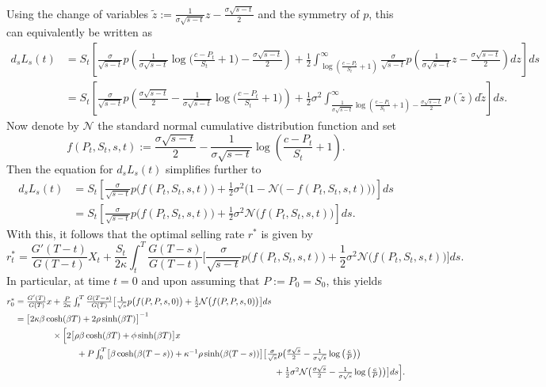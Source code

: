 \documentclass[openany,oneside]{article}
\theoremstyle{definition}
\theoremstyle{remark}
\newcommand{\ts}{\textstyle}
\begin{document}
{\color{blue}Using the change of variables $\tilde z := \frac{1}{\sigma\sqrt{s-t}}z-\frac{\sigma\sqrt{s-t}}{2}$ and the symmetry of $p$, this can equivalently be written as
\begin{align*}
 \ts d_s L_s(t) &\ts= S_t\left[ \frac{\sigma}{\sqrt{s-t}}p\left(\frac{1}{\sigma\sqrt{s-t}}\log\bigl(\frac{c-P_t}{S_t}+1\bigr)-\frac{\sigma\sqrt{s-t}}{2} \right)+\frac{1}{2}\int_{\log\left(\frac{c-P_t}{S_t}+1\right)}^\infty \frac{\sigma}{\sqrt{s-t}}p\left(\frac{1}{\sigma\sqrt{s-t}}z-\frac{\sigma\sqrt{s-t}}{2}\right)dz \right] ds\\
  &\ts = S_t\left[ \frac{\sigma}{\sqrt{s-t}}p\left(\frac{\sigma\sqrt{s-t}}{2}-\frac{1}{\sigma\sqrt{s-t}}\log\bigl(\frac{c-P_t}{S_t}+1\bigr) \right)+\frac{1}{2}\sigma^2 \int_{\frac{1}{\sigma\sqrt{s-t}}\log\left(\frac{c-P_t}{S_t}+1\right) - \frac{\sigma\sqrt{s-t}}{2}}^\infty p(\tilde z)d\tilde z \right] ds.
\end{align*}
Now denote by $\mathcal N$ the standard normal cumulative distribution function and set
\[
 \ts f(P_t,S_t,s,t) := \frac{\sigma\sqrt{s-t}}{2} - \frac{1}{\sigma\sqrt{s-t}}\log\left(\frac{c-P_t}{S_t}+1\right).
\]
Then the equation for $d_s L_s(t)$ simplifies further to
\begin{align*}
 \ts d_s L_s(t) &\ts= S_t\left[ \frac{\sigma}{\sqrt{s-t}}p\bigl(f(P_t,S_t,s,t)\bigr)+\frac{1}{2}\sigma^2 \bigl(1 - \mathcal N\bigl(-f(P_t,S_t,s,t)\bigr)\bigr)\right] ds\\
  &\ts= S_t\left[ \frac{\sigma}{\sqrt{s-t}}p\bigl(f(P_t,S_t,s,t)\bigr)+\frac{1}{2}\sigma^2 \mathcal N\bigl(f(P_t,S_t,s,t)\bigr)\right] ds.
\end{align*}
With this, it follows that the optimal selling rate $r^*$ is given by
\[
 \ts r_t^* = \frac{G'(T-t)}{G(T-t)} X_t + \frac{S_t}{2\kappa}\int_t^T  \frac{G(T-s)}{G(T-t)} \bigl[ \frac{\sigma}{\sqrt{s-t}}p\bigl(f(P_t,S_t,s,t)\bigr)+\frac{1}{2}\sigma^2 \mathcal N\bigl(f(P_t,S_t,s,t)\bigr)\bigr] ds.
\]
In particular, at time $t=0$ and upon assuming that $P:=P_0=S_0$, this yields
\begin{align*}
 \ts r_0^* &\ts= \frac{G'(T)}{G(T)} x + \frac{P}{2\kappa}\int_t^T  \frac{G(T-s)}{G(T)} \bigl[ \frac{1}{\sqrt{s}}p\bigl(f(P,P,s,0)\bigr)+\frac{1}{2}\mathcal N\bigl(f(P,P,s,0)\bigr)\bigr] ds\\
           &\ts= \bigl[2\kappa\beta\cosh(\beta T)+2\rho\sinh(\beta T)\bigr]^{-1}\\
					 &\ts\hspace{1.5cm}\times\Bigl[ 2\bigl[\rho\beta\cosh(\beta T)+\phi\sinh(\beta T)\bigr] x\\
					 &\ts\hspace{2.5cm}+ P\int_0^T  \bigl[\beta\cosh(\beta (T-s))+\kappa^{-1}\rho\sinh(\beta (T-s))\bigr] \bigl[ \frac{\sigma}{\sqrt{s}}p\bigl(\frac{\sigma\sqrt{s}}{2} - \frac{1}{\sigma\sqrt{s}}\log\left(\frac{c}{P}\right)\bigr)\\
					 &\ts\hspace{10.5cm}+\frac{1}{2}\sigma^2 \mathcal N\bigl(\frac{\sigma\sqrt{s}}{2} - \frac{1}{\sigma\sqrt{s}}\log\left(\frac{c}{P}\right)\bigr)\bigr] ds\Bigr].
\end{align*}
}
\end{document}
